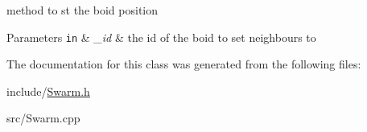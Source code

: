 method to st the boid position 


\begin{DoxyParams}[1]{Parameters}
\mbox{\tt in}  & {\em \-\_\-id} & the id of the boid to set neighbours to \\
\hline
\end{DoxyParams}


The documentation for this class was generated from the following files\-:\begin{DoxyCompactItemize}
\item 
include/\hyperlink{Swarm_8h}{Swarm.\-h}\item 
src/Swarm.\-cpp\end{DoxyCompactItemize}
